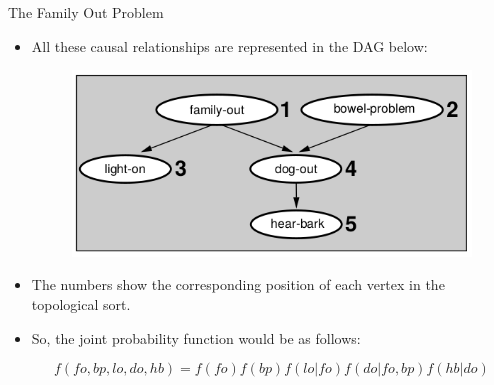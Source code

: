 \documentclass[handout]{beamer}
\begin{document}
\begin{frame}{The Family Out Problem}
\scriptsize{
\begin{itemize}



\item All these causal relationships are represented in the DAG below:

 
 \begin{figure}[h!]
	\centering
	\includegraphics[scale=0.5]{pics/fodag.png}
	\end{figure} 
 
\item The numbers show the corresponding  position of each vertex in the topological sort. 
 
\item So, the joint probability function would be as follows:

\begin{displaymath}
 f(fo,bp,lo,do,hb)=f(fo)f(bp)f(lo|fo)f(do|fo,bp)f(hb|do)
\end{displaymath}



\end{itemize}



} 

\end{frame}
\end{document}
